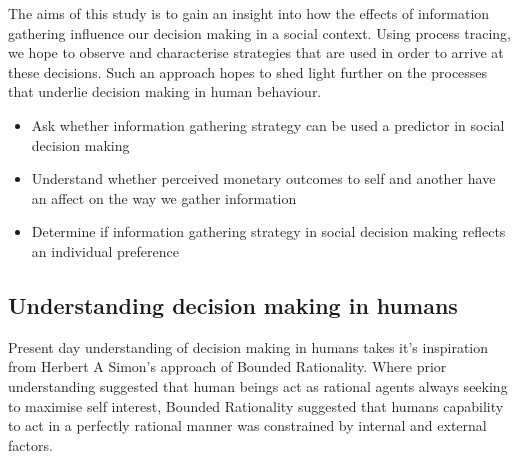 \documentclass[man, floatsintext]{apa7}
\begin{document}
The aims of this study is to gain an insight into how the effects of information gathering influence our decision making in a social context.  Using process tracing, we hope to observe and characterise strategies that are used in order to arrive at these decisions. Such an approach hopes to shed light further on the processes that underlie decision making in human behaviour.


\begin{itemize}
	\item Ask whether information gathering strategy can be used a predictor in social decision making
	\item Understand whether perceived monetary outcomes to self and another have an affect on the way we gather information
	\item Determine if information gathering strategy in social decision making reflects an individual preference
\end{itemize}

\subsection{Understanding decision making in humans}

Present day understanding of decision making in humans takes it's inspiration from Herbert A Simon's approach of Bounded Rationality. Where prior understanding suggested that human beings act as  rational agents always seeking to maximise self interest, Bounded Rationality suggested that humans capability to act in a perfectly rational manner was constrained by internal and external factors.

\end{document}
